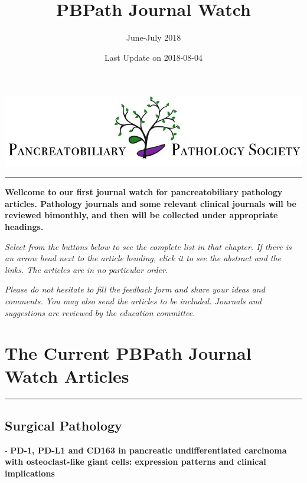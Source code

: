 \documentclass[]{article}
\title{PBPath Journal Watch}
\subtitle{June-July 2018}
\author{}
\date{Last Update on 2018-08-04}
\begin{document}
\maketitle

{
\setcounter{tocdepth}{2}
\tableofcontents
}
\href{http://pbpath.org/}{\includegraphics{figures/PBP_header_logo.jpg}}

\begin{center}\rule{0.5\linewidth}{\linethickness}\end{center}

\textbf{Wellcome to our first journal watch for pancreatobiliary
pathology articles. Pathology journals and some relevant clinical
journals will be reviewed bimonthly, and then will be collected under
appropriate headings.}

\emph{Select from the buttons below to see the complete list in that
chapter. If there is an arrow head next to the article heading, click it
to see the abstract and the links. The articles are in no particular
order.}

\emph{Please do not hesitate to fill the feedback form and share your
ideas and comments. You may also send the articles to be included.
Journals and suggestions are reviewed by the education committee.}

\pagebreak

\hypertarget{the-current-pbpath-journal-watch-articles}{%
\section{The Current PBPath Journal Watch
Articles}\label{the-current-pbpath-journal-watch-articles}}

\begin{center}\rule{0.5\linewidth}{\linethickness}\end{center}

\hypertarget{surgical-pathology}{%
\subsection{Surgical Pathology}\label{surgical-pathology}}

 - \textbf{PD-1, PD-L1 and CD163 in pancreatic undifferentiated
carcinoma with osteoclast-like giant cells: expression patterns and
clinical implications}
\end{document}
